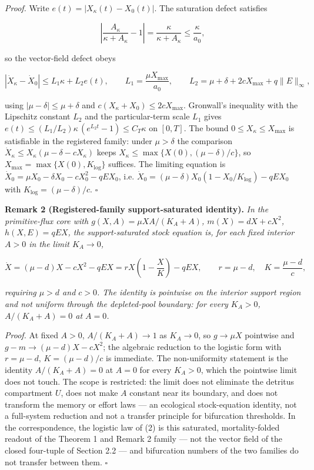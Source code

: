 \documentclass[11pt]{article}
\begin{document}
\emph{Proof.} Write \(e(t) = |X_\kappa(t) - X_0(t)|\). The saturation defect satisfies 

$$\left| \frac{A_\kappa}{\kappa + A_\kappa} - 1 \right| = \frac{\kappa}{\kappa + A_\kappa} \le \frac{\kappa}{a_0},$$

 so the vector-field defect obeys 

$$|\dot X_\kappa - \dot X_0| \le L_1 \kappa + L_2 e(t), \qquad L_1 = \frac{\mu X_{\max}}{a_0}, \qquad L_2 = \mu + \delta + 2cX_{\max} + q\|E\|_\infty,$$

 using \(|\mu - \delta| \le \mu +\allowbreak{} \delta\) and \(c(X_\kappa +\allowbreak{} X_0) \le 2cX_{\max}\). Gronwall's inequality with the Lipschitz constant \(L_2\) and the particular-term scale \(L_1\) gives \(e(t) \le (L_1/\allowbreak{}L_2)\kappa\,\allowbreak{}(e^{L_2 t} - 1) \le C_T \kappa\) on \([0,T]\). The bound \(0 \le X_\kappa \le X_{\max}\) is satisfiable in the registered family: under \(\mu > \delta\) the comparison \(\dot X_\kappa \le X_\kappa(\mu - \delta - cX_\kappa)\) keeps \(X_\kappa \le \max\{X(0),\allowbreak{} (\mu-\delta)/c\}\), so \(X_{\max} =\allowbreak{} \max\{X(0),\allowbreak{} K_{\log}\}\) suffices. The limiting equation is \(\dot X_0 =\allowbreak{} \mu X_0 - \delta X_0 - cX_0^2 - qE X_0\), i.e. \(\dot X_0 =\allowbreak{} (\mu - \delta)X_0 (1 - X_0/\allowbreak{}K_{\log}) - qE X_0\) with \(K_{\log} = (\mu - \delta)/c\). \(\square\)

\textbf{Remark 2 (Registered-family support-saturated identity).} \emph{In the primitive-flux core with \(g(X,A) = \mu XA/(K_A + A)\), \(m(X) = dX + cX^2\), \(h(X,E) = qEX\), the support-saturated stock equation is, for each fixed interior \(A > 0\) in the limit \(K_A \to 0\),} 

$$\dot X = (\mu - d)X - cX^2 - qEX = rX\left(1 - \frac{X}{K}\right) - qEX, \qquad r = \mu - d, \quad K = \frac{\mu - d}{c},$$

 \emph{requiring \(\mu > d\) and \(c > 0\). The identity is pointwise on the interior support region and not uniform through the depleted-pool boundary: for every \(K_A > 0\), \(A/(K_A + A) = 0\) at \(A = 0\).}

\emph{Proof.} At fixed \(A > 0\), \(A/(K_A + A) \to 1\) as \(K_A \to 0\), so \(g \to \mu X\) pointwise and \(g - m \to (\mu - d)X - cX^2\); the algebraic reduction to the logistic form with \(r = \mu - d\), \(K = (\mu - d)/c\) is immediate. The non-uniformity statement is the identity \(A/(K_A + A) = 0\) at \(A = 0\) for every \(K_A > 0\), which the pointwise limit does not touch. The scope is restricted: the limit does not eliminate the detritus compartment \(U\), does not make \(A\) constant near its boundary, and does not transform the memory or effort laws --- an ecological stock-equation identity, not a full-system reduction and not a transfer principle for bifurcation thresholds. In the correspondence, the logistic law of (2) is this saturated, mortality-folded readout of the Theorem 1 and Remark 2 family --- not the vector field of the closed four-tuple of Section 2.2 --- and bifurcation numbers of the two families do not transfer between them. \(\square\)
\end{document}
